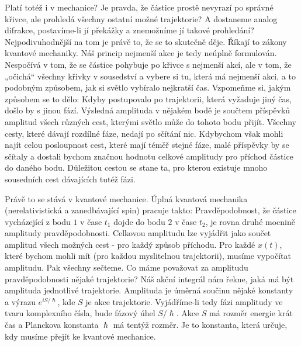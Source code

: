     Platí totéž i v mechanice? Je pravda, že částice prostě nevyrazí po správné křivce, ale prohledá
    všechny ostatní možné trajektorie? A dostaneme analog difrakce, postavíme-li jí překážky a
    znemožníme jí takové prohledání? Nejpodivuhodnější na tom je právě to, že se to skutečně děje.
    Říkají to zákony kvantové mechaniky. Náš princip nejmenší akce je tedy neúplně formulován.
    Nespočívá v tom, že se částice pohybuje po křivce s nejmenší akcí, ale v tom, že „očichá“
    všechny křivky v sousedství a vybere si tu, která má nejmenší akci, a to podobným způsobem, jak
    si světlo vybíralo nejkratší čas. Vzpomeňme si, jakým způsobem se to dělo: Kdyby postupovalo po
    trajektorii, která vyžaduje jiný čas, došlo by s jinou fází. Výsledná amplituda v nějakém bodě
    je součtem příspěvků amplitud všech různých cest, kterými světlo může do tohoto bodu přijít.
    Všechny cesty, které dávají rozdílné fáze, nedají po sčítání nic. Kdybychom však mohli najít
    celou posloupnost cest, které mají téměř stejné fáze, malé příspěvky by se sčítaly a dostali
    bychom značnou hodnotu celkové amplitudy pro příchod částice do daného bodu. Důležitou cestou se
    stane ta, pro kterou existuje mnoho sousedních cest dávajících tutéž fázi. 
    
    Právě to se stává v kvantové mechanice. Úplná kvantová mechanika (nerelativistická a
    zanedbávající spin) pracuje takto: Pravděpodobnost, že částice vycházející z bodu \(1\) v čase
    \(t_1\) dojde do bodu \(2\) v čase \(t_2\), je rovna druhé mocnině amplitudy pravděpodobnosti.
    Celkovou amplitudu lze vyjádřit jako součet amplitud všech možných cest - pro každý způsob
    příchodu. Pro každé \(x(t)\), které bychom mohli mít (pro každou myslitelnou trajektorii),
    musíme vypočítat amplitudu. Pak všechny sečteme. Co máme považovat za amplitudu pravděpodobnosti
    nějaké trajektorie? Náš akční integrál nám řekne, jaká má být amplituda jednotlivé trajektorie.
    Amplituda je úměrná součinu nějaké konstanty a výrazu \(e^{iS/\hslash}\), kde \(S\) je akce
    trajektorie. Vyjádříme-li tedy fázi amplitudy ve tvaru komplexního čísla, bude fázový úhel
    \(S/\hslash\). Akce \(S\) má rozměr energie krát čas a Planckova konstanta \(\hslash\) má tentýž
    rozměr. Je to konstanta, která určuje, kdy musíme přejít ke kvantové mechanice. 
    
